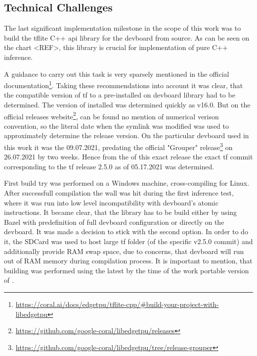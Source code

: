 {\subsection*{Technical Challenges}
\label{subsec:tecchallDeployment}

The last significant implementation milestone in the scope of this work was to build the \gls{tflite} C++ \gls{api} library for the \gls{devboard} from source.
As can be seen on the chart <REF>, this library is crucial for implementation of pure C++ inference.

A guidance to carry out this task is very sparsely mentioned in the official documentation\footnote{\url{https://coral.ai/docs/edgetpu/tflite-cpp/\#build-your-project-with-libedgetpu}}.
Taking these recommendations into account it was clear, that the compatible version of \gls{tf} to a pre-installed on \gls{devboard}  library had to be determined.
The version of installed  was determined quickly as v16.0. But on the official releases website\footnote{\url{https://github.com/google-coral/libedgetpu/releases}},
can be found no mention of numerical verison convention, so the literal date when the symlink  was modified was used to approximately determine the release version.
On the particular \gls{devboard} used in this work it was the 09.07.2021,
predating the official "Grouper"  release\footnote{\url{https://github.com/google-coral/libedgetpu/tree/release-grouper}} on 26.07.2021 by two weeks.
Hence from the  of this exact release the exact \gls{tf} commit corresponding to the \gls{tf} release 2.5.0 as of 05.17.2021 was determined.

First build try was performed on a Windows machine, cross-compiling for  Linux. After successfull compilation the wall was hit during the first inference test,
where it was run into low level incompatibility with \gls{devboard}'s atomic instructions. It became clear, that the library has to be build either by using Bazel with predefinition
of full \gls{devboard} configuration or directly on the \gls{devboard}. It was made a decision to stick with the second option. In order to do it, the SDCard was used to host large
\gls{tf} folder (of the specific v2.5.0 commit) and additionally provide RAM swap space, due to concerns,
that \gls{devboard} will run out of RAM memory during compilation process. It is important to mention,
that building was performed using the latest by the time of the work portable version of . 

}
